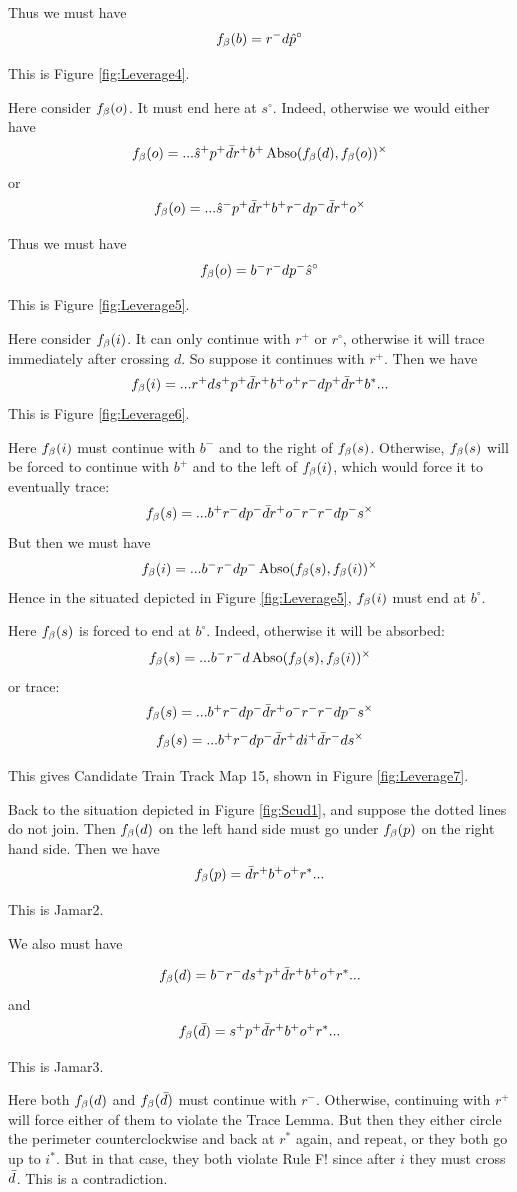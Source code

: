 Thus we must have
\[
f_\beta(b) = r^- d \hat{p}^\circ
\]

This is Figure \ref{fig:Leverage4}.

Here consider $f_\beta(o)$. It must end here at $s^\circ$. Indeed, otherwise we would either have
\[
f_\beta(o) = ...\hat{s}^+ p^+ \bar{d} r^+ b^+ \operatorname{Abso}(f_\beta(d), f_\beta(o))^\times
\]
or
\[
f_\beta(o) = ...\hat{s}^- p^+ \bar{d} r^+ b^+ r^- d p^- \bar{d} r^+ o^\times
\]

Thus we must have
\[
f_\beta(o) = b^- r^- d p^- \hat{s}^\circ
\]

This is Figure \ref{fig:Leverage5}.

Here consider $f_\beta(i)$. It can only continue with $r^+$ or $r^\circ$, otherwise it will trace immediately after crossing $d$. So suppose it continues with $r^+$. Then we have
\[
f_\beta(i) = ...r^+ d s^+ p^+ \bar{d} r^+ b^+ o^+ r^- d p^+ \bar{d} r^+ b^*...
\]
This is Figure \ref{fig:Leverage6}.

Here $f_\beta(i)$ must continue with $b^-$ and to the right of $f_\beta(s)$. Otherwise, $f_\beta(s)$ will be forced to continue with $b^+$ and to the left of $f_\beta(i)$, which would force it to eventually trace:
\[
f_\beta(s) = ...b^+ r^- d p^- \bar{d} r^+ o^- r^- r^- d p^- s^\times
\]
But then we must have
\[
f_\beta(i) = ...b^- r^- d p^- \operatorname{Abso}(f_\beta(s), f_\beta(i))^\times
\]
Hence in the situated depicted in Figure \ref{fig:Leverage5}, $f_\beta(i)$ must end at $b^\circ$.

Here $f_\beta(s)$ is forced to end at $b^\circ$. Indeed, otherwise it will be absorbed:
\[
f_\beta(s) = ...b^- r^- d \operatorname{Abso}(f_\beta(s), f_\beta(i))^\times
\]
or trace:
\[
f_\beta(s) = ...b^+ r^- d p^- \bar{d} r^+ o^- r^- r^- d p^- s^\times
\]
\[
f_\beta(s) = ...b^+ r^- d p^- \bar{d} r^+ d i^+ \bar{d} r^- d s^\times
\]

This gives Candidate Train Track Map 15, shown in Figure \ref{fig:Leverage7}.


Back to the situation depicted in Figure \ref{fig:Scud1}, and suppose the dotted lines do not join. Then $f_\beta(d)$ on the left hand side must go under $f_\beta(p)$ on the right hand side. Then we have
\[
f_\beta(p) = \bar{d} r^+ b^+ o^+ r^*...
\]

This is Jamar2.

We also must have 

\[
f_\beta(d) = b^- r^- d s^+ p^+ \bar{d} r^+ b^+ o^+ r^*...
\]
and
\[
f_\beta(\bar{d}) = s^+ p^+ \bar{d} r^+ b^+ o^+ r^*...
\]

This is Jamar3.

Here both $f_\beta(d)$ and $f_\beta(\bar{d})$ must continue with $r^-$. Otherwise, continuing with $r^+$ will force either of them to violate the Trace Lemma. But then they either circle the perimeter counterclockwise and back at $r^*$ again, and repeat, or they both go up to $i^*$. But in that case, they both violate Rule F! since after $i$ they must cross $\bar{d}$. This is a contradiction.

